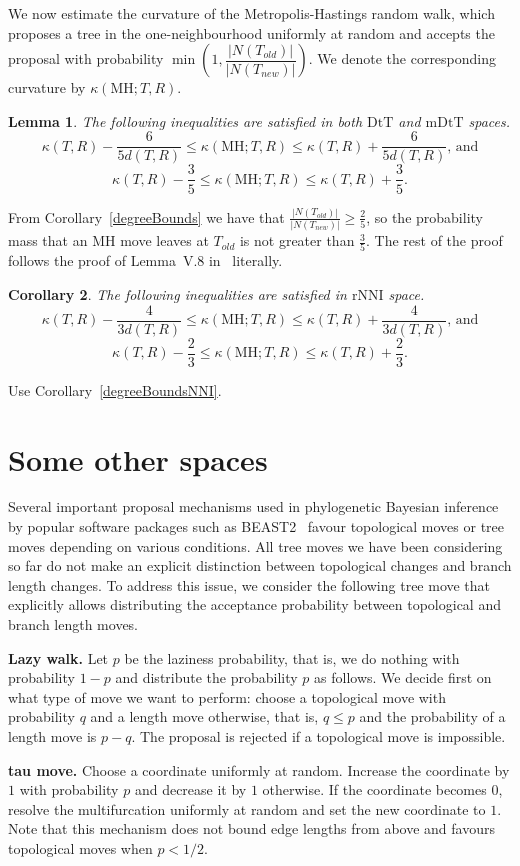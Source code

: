\documentclass{amsart}
\newtheorem{lemma}{Lemma}
\newtheorem{corollary}[lemma]{Corollary}
\newcommand{\dts}{\mathrm{DtT}}
\newcommand{\rnni}{\mathrm{rNNI}}
\newcommand{\mdts}{\mathrm{mDtT}}
\newcommand{\MH}{\mathrm{MH}}
\begin{document}
We now estimate the curvature of the Metropolis-Hastings random walk, which
proposes a tree in the one-neighbourhood uniformly at random and
accepts the proposal with probability
$\min\left(1, \dfrac{|N(T_{old})|}{|N(T_{new})|}\right)$. We denote the corresponding
curvature by $\kappa(\MH;T,R)$.

\begin{lemma}
The following inequalities are satisfied in both $\dts$ and $\mdts$ spaces.
\[
\kappa(T,R) - \dfrac{6}{5d(T,R)} \leq \kappa(\MH;T,R) \leq \kappa(T,R) +
\dfrac{6}{5d(T,R)}\mbox{, and}
\]
\[
\kappa(T,R) - \dfrac35 \leq \kappa(\MH;T,R) \leq \kappa(T,R) + \dfrac35.
\]
\end{lemma}

\proof
From Corollary~\ref{degreeBounds} we have that
$\frac{|N(T_{old})|}{|N(T_{new})|} \geq \frac{2}{5}$, so the probability
mass that an MH move leaves at $T_{old}$ is not greater than $\frac35$.
The rest of the
proof follows the proof of Lemma~V.8 in~\cite{Whidden2015-es} literally.
\endproof

\begin{corollary}
The following inequalities are satisfied in $\rnni$  space.
\[
\kappa(T,R) - \dfrac{4}{3d(T,R)} \leq \kappa(\MH;T,R) \leq \kappa(T,R) +
\dfrac{4}{3d(T,R)}\mbox{, and}
\]
\[
\kappa(T,R) - \dfrac23 \leq \kappa(\MH;T,R) \leq \kappa(T,R) + \dfrac23.
\]
\end{corollary}

\proof
Use Corollary~\ref{degreeBoundsNNI}.
\endproof

\section{Some other spaces}

Several important proposal mechanisms used in phylogenetic Bayesian inference by
popular software packages such as BEAST2~\cite{beast2} favour topological moves
or tree moves depending on various conditions. All tree moves we have been
considering so far do not make an explicit distinction between topological
changes and branch length changes. To address this issue, we
consider the
following tree move that explicitly allows distributing the acceptance
probability between topological and branch length moves.

{\bf Lazy walk.} Let $p$ be the laziness probability, that is, we do nothing
with probability $1-p$ and distribute the probability $p$ as follows.
We decide first on what type of move we want to perform: choose a topological
move with probability $q$ and a length move otherwise, that is, $q \leq p$
and the probability of a length move is $p-q$. The proposal is rejected if
a topological move is impossible.

{\bf tau move.} Choose a coordinate uniformly at random. Increase the
coordinate by $1$ with probability $p$ and decrease it by $1$ otherwise.
If the coordinate becomes $0$, resolve the multifurcation uniformly at
random and set the new coordinate to $1$. Note that this mechanism
does not bound edge lengths from above and favours topological moves when
$p<1/2$.



\end{document}
